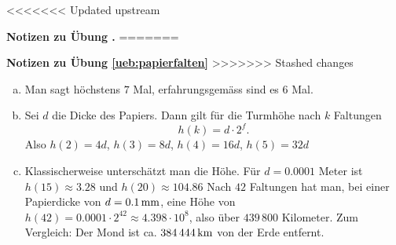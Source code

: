 \documentclass[%
11pt,%
twoside,%
titlepage,%
swissgerman,%
headsepline%
]{scrartcl}
\newcommand{\faReturnGray}{\textcolor{gray}{\faMailReply}} %
\theoremstyle{definition}
\theoremstyle{plain}
\newcommand{\concatueb}[1]{ueb:#1}%
\newcommand{\concatlsg}[1]{lsg:#1}%
\newcounter{uebcounter}[section]
\renewcommand{\theuebcounter}{\thesection.\arabic{uebcounter}}  %
\newenvironment{lsg}[1]{%
<<<<<<< Updated upstream
    \par\noindent\textbf{Notizen zu Übung \theuebcounter\label{\concatlsg{#1}}}
=======
    \par\noindent\textbf{Notizen zu Übung \ref{\concatueb{#1}}}\label{\concatlsg{#1}}
>>>>>>> Stashed changes
    \hfill\hyperref[\concatueb{#1}]{\faReturnGray}\par %
}{%
    \par%
}
\begin{document}
\begin{lsg}{papierfalten}
    \begin{enumerate}[a)]
        \item Man sagt höchstens $7$ Mal, erfahrungsgemäss sind es $6$ Mal.
        \item Sei $d$ die Dicke des Papiers. Dann gilt für die Turmhöhe nach $k$ Faltungen
        $$h(k)=d\cdot 2^f.$$
        Also $h(2)=4d$, $h(3)=8d$, $h(4)=16d$, $h(5)=32d$
        \item Klassischerweise unterschätzt man die Höhe. Für $d=0.0001$ Meter ist $h(15)\approx3.28$ und $h(20)\approx104.86$ Nach $42$ Faltungen hat man, bei einer Papierdicke von $d=\unit[0.1]{mm}$, eine Höhe von $h(42)=0.0001\cdot2^{42}\approx4.398\cdot10^8$, also über $439\,800$ Kilometer. Zum Vergleich: Der Mond ist ca. $\unit[384\,444]{km}$ von der Erde entfernt. 
    \end{enumerate}
\end{lsg}
\end{document}
